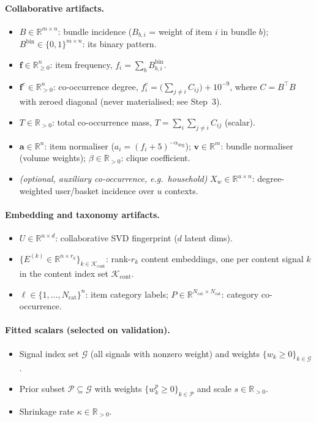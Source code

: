 \documentclass[11pt]{article}
\newcommand{\R}{\mathbb{R}}
\begin{document}
\paragraph{Collaborative artifacts.}
\begin{itemize}\itemsep0pt
  \item $B \in \R^{m \times n}$: bundle incidence ($B_{b,i}$ = weight of item $i$ in bundle $b$);
        $B^{\mathrm{bin}} \in \{0,1\}^{m \times n}$: its binary pattern.
  \item $\bm{f} \in \R^{n}_{\ge 0}$: item frequency, $f_i = \sum_b B^{\mathrm{bin}}_{b,i}$.
  \item $\bm{f}^{c} \in \R^{n}_{>0}$: co-occurrence degree, $f^{c}_i = \big(\textstyle\sum_{j\neq i} C_{ij}\big) + 10^{-9}$,
        where $C = B^\top B$ with zeroed diagonal (never materialised; see Step~3).
  \item $T \in \R_{>0}$: total co-occurrence mass, $T = \sum_{i}\sum_{j\neq i} C_{ij}$ (scalar).
  \item $\bm{a} \in \R^{n}$: item normaliser ($a_i = (f_i+5)^{-\alpha_{\mathrm{deg}}}$);\quad
        $\bm{v} \in \R^{m}$: bundle normaliser (volume weights);\quad
        $\beta \in \R_{>0}$: clique coefficient.
  \item \emph{(optional, auxiliary co-occurrence, e.g.\ household)} $X_w \in \R^{u \times n}$:
        degree-weighted user/basket incidence over $u$ contexts.
\end{itemize}

\paragraph{Embedding and taxonomy artifacts.}
\begin{itemize}\itemsep0pt
  \item $U \in \R^{n \times d}$: collaborative SVD fingerprint ($d$ latent dims).
  \item $\{E^{(k)} \in \R^{n \times r_k}\}_{k \in \mathcal{K}_{\mathrm{cont}}}$: rank-$r_k$ content embeddings,
        one per content signal $k$ in the content index set $\mathcal{K}_{\mathrm{cont}}$.
  \item $\bm{\ell} \in \{1,\dots,N_{\mathrm{cat}}\}^{n}$: item category labels;\quad
        $P \in \R^{N_{\mathrm{cat}} \times N_{\mathrm{cat}}}$: category co-occurrence.
\end{itemize}

\paragraph{Fitted scalars (selected on validation).}
\begin{itemize}\itemsep0pt
  \item Signal index set $\mathcal{G}$ (all signals with nonzero weight) and weights $\{w_k \ge 0\}_{k\in\mathcal{G}}$.
  \item Prior subset $\mathcal{P} \subseteq \mathcal{G}$ with weights $\{w^{p}_k \ge 0\}_{k\in\mathcal{P}}$ and
        scale $s \in \R_{>0}$.
  \item Shrinkage rate $\kappa \in \R_{>0}$.
\end{itemize}
\end{document}
